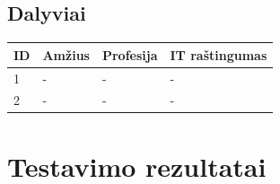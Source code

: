 \documentclass[oneside]{VUMIFPSkursinis}
\begin{document}
\subsection{Dalyviai}
\begin{center}
	\begin{tabular}{ |p{1cm} | p{2cm} | p{4cm} | p{4cm} |}
	\hline
ID&Amžius&Profesija&IT raštingumas \\ \hline
1&-&-&- \\ \hline
2&-&-&- \\ \hline
\end{tabular}
\end{center}

\section{Testavimo rezultatai}
\end{document}
